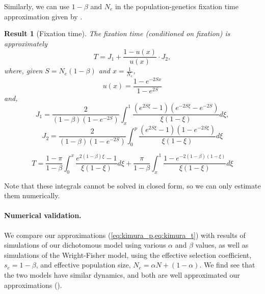 \documentclass[12pt]{extarticle}
\newtheorem{result}{Result}
\begin{document}
Similarly, we can use $1-\beta$ and $N_e$ in the population-genetics fixation time approximation given by \citet[eq.~17]{kimura_average}.\\


\begin{result}[Fixation time] The fixation time (conditioned on fixation) is approximately
\begin{equation}
T = J_1 + \frac{1-u(x)}{u(x)}\cdot J_2,
\end{equation}
where, given $S=N_e(1-\beta)$ and $x=\frac{1}{N_e}$,
\begin{equation}
u(x)=\frac{1-e^{-2Sx}}{1-e^{2S}}
\end{equation}
and,
\begin{equation}
J_1 = \frac{2}{(1-\beta)(1-e^{-2S})}\int_x^1 \frac{(e^{2S\xi}-1)(e^{-2S\xi}-e^{-2S})}{\xi(1-\xi)}d\xi,
\end{equation}
\begin{equation}
J_2= \frac{2}{(1-\beta)(1-e^{-2S})}\int_0^p \frac{(e^{2S\xi}-1)(1-e^{-2S\xi})}{\xi(1-\xi)}d\xi
\end{equation}

\begin{equation}\label{eq:kimura_t}
T = \frac{1-\pi}{1-\beta}\int_0^x\frac{e^{2(1-\beta) \xi}-1}{\xi(1-\xi)}d\xi+ \frac{\pi}{1-\beta}\int_x^1\frac{1-e^{-2(1-\beta)(1-\xi)}}{\xi(1-\xi)}d\xi
\end{equation}
\end{result}
Note that these integrals cannot be solved in closed form, so we can only estimate them numerically.

\paragraph{Numerical validation.}
We compare our approximations (\cref{eq:kimura_p,eq:kimura_t}) with results of simulations of our dichotomous model using various $\alpha$ and $\beta$ values, as well as simulations of the Wright-Fisher model, using the effective selection coefficient, $s_e=1-\beta$, and effective population size, $N_e=\alpha N + (1-\alpha)$. 
We find see that the two models have similar dynamics, and both are well approximated our approximations ().
\end{document}
